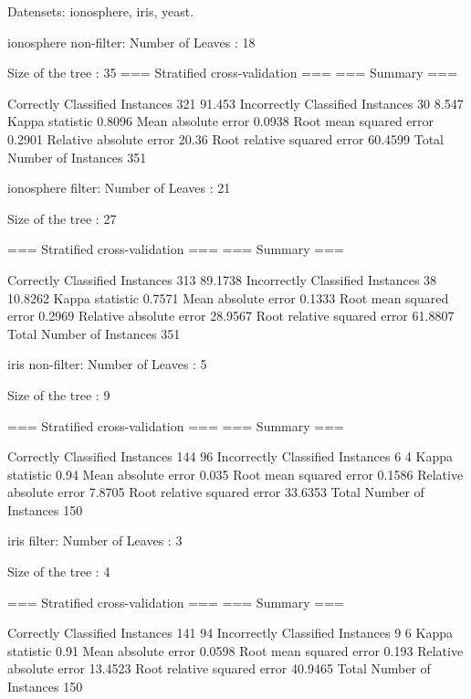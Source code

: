 Datensets: ionosphere, iris, yeast.

ionosphere non-filter:
Number of Leaves  : 	18

Size of the tree : 	35
=== Stratified cross-validation ===
=== Summary ===

Correctly Classified Instances         321               91.453  %
Incorrectly Classified Instances        30                8.547  %
Kappa statistic                          0.8096
Mean absolute error                      0.0938
Root mean squared error                  0.2901
Relative absolute error                 20.36   %
Root relative squared error             60.4599 %
Total Number of Instances              351

ionosphere filter:
Number of Leaves  : 	21

Size of the tree : 	27

=== Stratified cross-validation ===
=== Summary ===

Correctly Classified Instances         313               89.1738 %
Incorrectly Classified Instances        38               10.8262 %
Kappa statistic                          0.7571
Mean absolute error                      0.1333
Root mean squared error                  0.2969
Relative absolute error                 28.9567 %
Root relative squared error             61.8807 %
Total Number of Instances              351     


iris non-filter:
Number of Leaves  : 	5

Size of the tree : 	9

=== Stratified cross-validation ===
=== Summary ===

Correctly Classified Instances         144               96      %
Incorrectly Classified Instances         6                4      %
Kappa statistic                          0.94  
Mean absolute error                      0.035 
Root mean squared error                  0.1586
Relative absolute error                  7.8705 %
Root relative squared error             33.6353 %
Total Number of Instances              150     


iris filter:
Number of Leaves  : 	3

Size of the tree : 	4

=== Stratified cross-validation ===
=== Summary ===

Correctly Classified Instances         141               94      %
Incorrectly Classified Instances         9                6      %
Kappa statistic                          0.91  
Mean absolute error                      0.0598
Root mean squared error                  0.193 
Relative absolute error                 13.4523 %
Root relative squared error             40.9465 %
Total Number of Instances              150     



